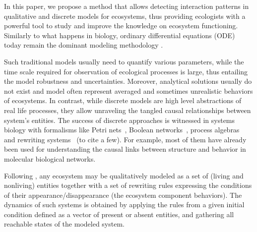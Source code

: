 \documentclass[a4paper,twoside]{article}
\begin{document}
In this paper, we propose a method that allows detecting interaction patterns in qualitative and discrete models for ecosystems, thus providing ecologists with a powerful tool to study and  improve the knowledge on ecosystem functioning. %
Similarly to what happens in biology, ordinary differential equations (ODE) today remain the dominant modeling methodology \cite{may72,Lotka1925}. %
    
Such traditional models usually need to quantify various parameters, while the time scale required for observation of ecological processes is large, thus entailing the model robustness and uncertainties. %
Moreover, analytical solutions usually do not exist and model often represent averaged and sometimes unrealistic behaviors of ecosystems. %
In contrast, while discrete models are high level abstractions of real life processes, they allow unraveling the tangled causal relationships between system's entities. %
The success of discrete approaches is witnessed in systems biology with formalisms like Petri
 nets~\cite{DBLP:journals/nc/BaldanCMS10}, Boolean networks~\cite{thomas1973boolean},
 process algebras~\cite{journals/tcsb/Cardelli05} and rewriting systems~\cite{giavitto04a} (to cite a few). %
For example, most of them have already been used for understanding the causal links between structure and behavior in molecular biological networks. 


Following \cite{pommereau-gaucherel2017}, any ecosystem may be qualitatively modeled as a set of (living and nonliving) entities together with a set of rewriting rules expressing the conditions of their appearance/disappearance (\ie the ecosystem component behaviors). %
The dynamics of such systems is obtained by applying the rules from a given initial condition
defined as a vector of present or absent entities, and gathering all reachable states of the modeled system. %
\end{document}
